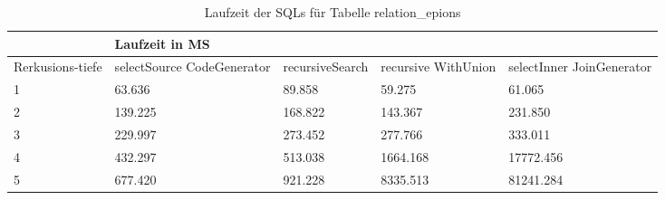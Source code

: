 \begin{table}[H]
	\begin{tabular}{l|l|l|l|l|l|}
		\cline{2-6}
		& \multicolumn{5}{|l|}{Laufzeit in MS}                                                                                                                                                  \\ \hline
		\multicolumn{1}{|l|}{\multirow{2}{2cm}{Rerkusions-tiefe}} & \multicolumn{2}{|l|}{\multirow{2}{3cm}{selectSource CodeGenerator}} & \multirow{2}{2.8cm}{recursiveSearch} & \multirow{2}{2.5cm}{recursive WithUnion} & \multirow{2}{2.5cm}{selectInner JoinGenerator} \\
		\multicolumn{1}{|l|}{}
		& \multicolumn{2}{|l|}{}                                           &                                  &                                     &                                           \\ \hline
	\multicolumn{1}{|l|}{1}               & \multicolumn{2}{l|}{63.636}                                     & 89.858                           & 59.275                              & 61.065                                    \\ \hline
	\multicolumn{1}{|l|}{2}               & \multicolumn{2}{l|}{139.225}                                    & 168.822                          & 143.367                             & 231.850                                   \\ \hline
	\multicolumn{1}{|l|}{3}               & \multicolumn{2}{l|}{229.997}                                    & 273.452                          & 277.766                             & 333.011                                   \\ \hline
	\multicolumn{1}{|l|}{4}               & \multicolumn{2}{l|}{432.297}                                    & 513.038                          & 1664.168                            & 17772.456                                 \\ \hline
	\multicolumn{1}{|l|}{5}               & \multicolumn{2}{l|}{677.420}                                    & 921.228                          & 8335.513                            & 81241.284                                 \\ \hline
	
	\end{tabular}
	\caption{Laufzeit der SQLs für Tabelle relation\_epions}
\end{table}
